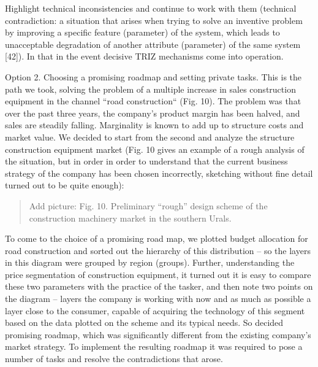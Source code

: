 \documentclass[11pt,a4paper]{book}
\newcommand{\addpicture}[1]{
  \begin{quote} Add picture: #1\end{quote}
}
\begin{document}
Highlight technical inconsistencies and continue to work with them (technical
contradiction: a situation that arises when trying to solve an inventive
problem by improving a specific feature (parameter) of the system, which leads
to unacceptable degradation of another attribute (parameter) of the same
system [42]). In that in the event decisive TRIZ mechanisms come into
operation.

Option 2. Choosing a promising roadmap and setting private tasks. This is the
path we took, solving the problem of a multiple increase in sales construction
equipment in the channel “road construction“ (Fig. 10). The problem was that
over the past three years, the company's product margin has been halved, and
sales are steadily falling. Marginality is known to add up to structure costs
and market value. We decided to start from the second and analyze the
structure construction equipment market (Fig. 10 gives an example of a rough
analysis of the situation, but in order in order to understand that the
current business strategy of the company has been chosen incorrectly,
sketching without fine detail turned out to be quite enough):

\addpicture{Fig. 10. Preliminary “rough” design scheme of the construction
  machinery market in the southern Urals.}

To come to the choice of a promising road map, we plotted budget allocation
for road construction and sorted out the hierarchy of this distribution -- so
the layers in this diagram were grouped by region (groups). Further,
understanding the price segmentation of construction equipment, it turned out
it is easy to compare these two parameters with the practice of the tasker,
and then note two points on the diagram -- layers the company is working with
now and as much as possible a layer close to the consumer, capable of
acquiring the technology of this segment based on the data plotted on the
scheme and its typical needs. So decided promising roadmap, which was
significantly different from the existing company’s market strategy. To
implement the resulting roadmap it was required to pose a number of tasks and
resolve the contradictions that arose.
\end{document}
